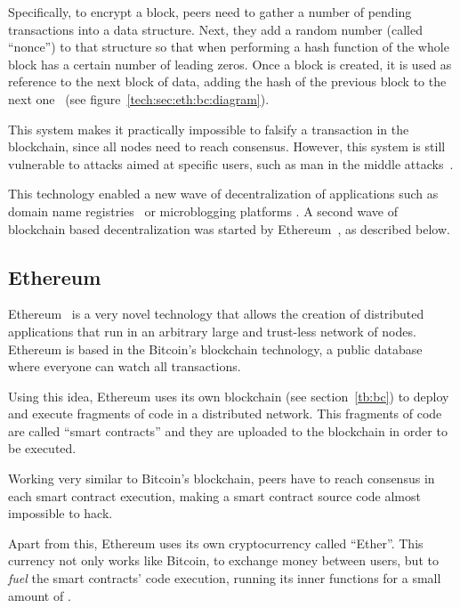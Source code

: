 Specifically, to encrypt a block, peers need to gather a number of pending
transactions into a data structure. Next, they add a random number (called
``nonce'') to that structure so that when performing a hash function of the
whole block has a certain number of leading zeros. Once a block is created, it
is used as reference to the next block of data, adding the hash of the previous
block to the next one~\cite{antonopoulos2014mastering} (see
figure~\ref{tech:sec:eth:bc:diagram}).


This system makes it practically impossible to falsify a transaction in the
blockchain, since all nodes need to reach consensus. However, this system is
still vulnerable to attacks aimed at specific users, such as man in the middle
attacks~\cite{moore2013beware}.

This technology enabled a new wave of decentralization of applications such as
domain name registries~\cite{benshoof2016distributed} or microblogging platforms
\cite{freitas2013twister}. A second wave of blockchain based decentralization
was started by Ethereum~\cite{buterin2014ethereum}, as described below.

\subsection{Ethereum}
\label{tb:eth}
Ethereum~\cite{buterin2014ethereum} is a very novel technology that allows the
creation of distributed applications that run in an arbitrary large and
trust-less network of nodes. Ethereum is based in the Bitcoin's blockchain
technology, a public database where everyone can watch all transactions.

Using this idea, Ethereum uses its own blockchain (see section~\ref{tb:bc}) to
deploy and execute fragments of code in a distributed network. This fragments of
code are called ``smart contracts'' and they are uploaded to the blockchain in
order to be executed.

Working very similar to Bitcoin's blockchain, peers have to reach consensus in
each smart contract execution, making a smart contract source code almost
impossible to hack.

Apart from this, Ethereum uses its own cryptocurrency called ``Ether''. This
currency not only works like Bitcoin, to exchange money between users, but to
\emph{fuel} the smart contracts' code execution, running its inner functions for
a small amount of .

